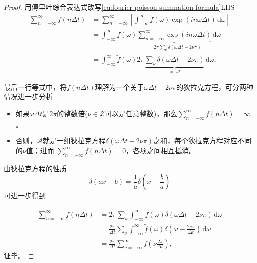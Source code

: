 \begin{proof}
  用傅里叶综合表达式改写\eqref{eq:fourier-poisson-summation-formula}LHS
  \begin{equation*}
    \begin{split}
      \sum_{n=-\infty}^{\infty} f \left( n \Delta t \right)
      & =
      \sum_{n=-\infty}^{\infty}
      \left[
      \int_{-\infty}^{\infty} \tilde{f} \left( \omega \right)
      \exp \left( i n \omega \Delta t \right) \, \mathrm{d} \omega
      \right]\\
      & = \int_{-\infty}^{\infty} \tilde{f} \left( \omega \right)
      \underbrace{
      \sum_{n=-\infty}^{\infty}
      \exp \left( i n \omega \Delta t \right)
      }_{= 2 \pi \sum_{\nu} \delta \left( \omega \Delta t - 2 \nu \pi \right)}
      \, \mathrm{d} \omega \\
      & = \int_{-\infty}^{\infty} \tilde{f} \left( \omega \right)
      2 \pi \underbrace{
      \sum_{\nu} \delta \left( \omega \Delta t - 2 \nu \pi \right)
      }_{\eqqcolon \mathcal{A}}
      \, \mathrm{d} \omega,
    \end{split}
  \end{equation*}

  最后一行等式中，将$f \left( n \Delta t \right)$理解为一个关于$\omega \Delta t - 2 \nu \pi$的狄拉克方程，可分两种情况进一步分析
  \begin{itemize}
    \item 如果$\omega \Delta t$是$2 \pi$的整数倍($\nu \in \mathcal{Z}$可以是任意整数)，那么$\sum_{n=-\infty}^{\infty} f \left( n \Delta t \right) = \infty$。
    \item 否则，$\mathcal{A}$就是一组狄拉克方程$\delta \left( \omega \Delta t - 2 \nu \pi \right)$之和，每个狄拉克方程对应不同的$\nu$值；进而
    $\sum_{n=-\infty}^{\infty} f \left( n \Delta t \right) =0$，各项之间相互抵消。
  \end{itemize}

由狄拉克方程的性质
\begin{equation*}
  \delta \left( a x - b \right) = \frac{1}{a} \delta \left( x - \frac{b}{a} \right)
\end{equation*}
可进一步得到

\begin{equation*}
\begin{split}
    \sum_{n=-\infty}^{\infty} f \left( n \Delta t \right)
    & = 2 \pi \sum_{\nu} \int_{-\infty}^{\infty} \tilde{f} \left( \omega \right) \delta \left( \omega \Delta t - 2 \nu \pi \right) \, \mathrm{d} \omega\\
    & = \frac{2 \pi}{\Delta t} \sum_{\nu} \int_{-\infty}^{\infty}
    \tilde{f} \left( \omega \right)
    \delta \left( \omega - \frac{2 \nu \pi}{\Delta t} \right) \, \mathrm{d} \omega\\
    & = \frac{2 \pi}{\Delta t} \sum_{\nu = - \infty}^{\infty} \tilde{f} \left( \nu \frac{2 \pi}{\Delta t} \right),
\end{split}
\end{equation*}
证毕。
\end{proof}

